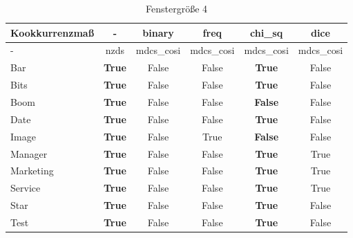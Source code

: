 \documentclass[11pt,numbers=noenddot]{scrartcl}
\begin{document}
\begin{table}[h]
    \begin{center}
        \begin{tabular}{ l | *{5}{c}  }
            Kookkurrenzmaß & - & binary & freq & chi\_sq & dice \\ \hline
               -      & nzds   &  mdcs\_cosi & mdcs\_cosi & mdcs\_cosi & mdcs\_cosi  \\ \hline
            Bar      &  \textbf{True}   &  False     &   False   &  \textbf{True}  & False    \\
            Bits     &  \textbf{True}   &  False     &   False   &  \textbf{True}   & False    \\
            Boom     &  \textbf{True}   &  False     &   False   &  \textbf{False}   & False    \\
            Date     &  \textbf{True}   &  False     &   False   &  \textbf{True}   & False   \\
            Image    &  \textbf{True}   &  False     &   True   &  \textbf{False}   & False   \\
            Manager  &  \textbf{True}   &  False     &   False   &  \textbf{True}   & True  \\
            Marketing&  \textbf{True}   &  False     &   False   &  \textbf{True}   & True   \\
            Service  &  \textbf{True}   &  False     &   False   &  \textbf{True}   & True   \\
            Star     &  \textbf{True}   &  False     &   False   &  \textbf{True}   & False  \\
            Test     &  \textbf{True}   &  False     &   False   &  \textbf{True} & False
        \end{tabular}
    \end{center}
    \caption{Fenstergröße 4}
\end{table}
\end{document}
